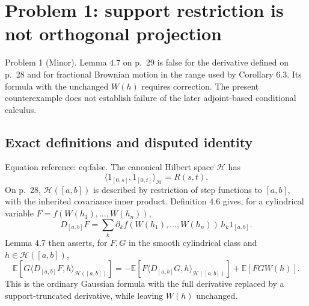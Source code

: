 \documentclass[10pt]{article}
\begin{document}
\section*{Problem 1: support restriction is not orthogonal projection}
Problem 1 (Minor).  Lemma 4.7 on p. 29 is false for the derivative defined on p. 28 and for fractional Brownian motion in the range used by Corollary 6.3. Its formula with the unchanged \(W(h)\) requires correction. The present counterexample does not establish failure of the later adjoint-based conditional calculus.\par
\subsection*{Exact definitions and disputed identity}
Equation reference: eq:false. The canonical Hilbert space \(\mathcal H\) has \[\langle 1_{[0,s]},1_{[0,t]}\rangle_{\mathcal H}=R(s,t).\] On p. 28, \(\mathcal H([a,b])\) is described by restriction of step functions to \([a,b]\), with the inherited covariance inner product. Definition 4.6 gives, for a cylindrical variable \(F=f(W(h_1),\ldots,W(h_n))\), \[D_{[a,b]}F
   =\sum_k \partial_k f(W(h_1),\ldots,W(h_n))\,h_k1_{[a,b]} .\] Lemma 4.7 then asserts, for \(F,G\) in the smooth cylindrical class and \(h\in\mathcal H([a,b])\), \[
 \mathbb E\!\left[G\langle D_{[a,b]}F,h\rangle_{\mathcal H([a,b])}\right]
 =-\mathbb E\!\left[F\langle D_{[a,b]}G,h\rangle_{\mathcal H([a,b])}\right]
   +\mathbb E[FGW(h)].\] This is the ordinary Gaussian formula with the full derivative replaced by a support-truncated derivative, while leaving \(W(h)\) unchanged.\par
\end{document}
